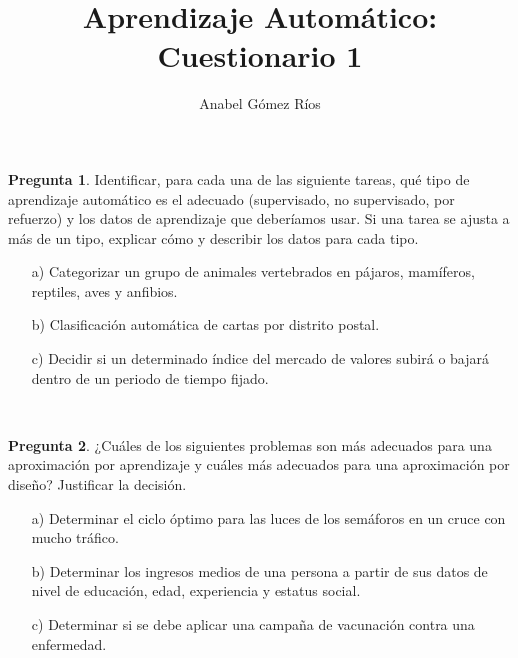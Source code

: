 \documentclass[12pt]{article}
\title{Aprendizaje Automático: Cuestionario 1}
\author{Anabel G\'omez R\'ios}
\theoremstyle{definition}
\begin{document}
\maketitle

\newtheorem{pregunta}{Pregunta}

\begin{pregunta}
Identificar, para cada una de las siguiente tareas, qué tipo de aprendizaje automático es el adecuado (supervisado, no supervisado, por refuerzo) y los datos de aprendizaje que deberíamos usar. Si una tarea se ajusta a más de un tipo, explicar cómo y describir los datos para cada tipo.
\begin{enumerate}
\item[a)] Categorizar un grupo de animales vertebrados en pájaros, mamíferos, reptiles, aves y anfibios.
\item[b)] Clasificación automática de cartas por distrito postal.
\item[c)] Decidir si un determinado índice del mercado de valores subirá o bajará dentro de un periodo de tiempo fijado.
\end{enumerate}
\textit{ }\\



\end{pregunta}

\begin{pregunta}
¿Cuáles de los siguientes problemas son más adecuados para una aproximación por aprendizaje y cuáles más adecuados para una aproximación por diseño? Justificar la decisión.
\begin{enumerate}
\item[a)] Determinar el ciclo óptimo para las luces de los semáforos en un cruce con mucho tráfico.
\item[b)] Determinar los ingresos medios de una persona a partir de sus datos de nivel de educación, edad, experiencia y estatus social.
\item[c)] Determinar si se debe aplicar una campaña de vacunación contra una enfermedad.
\end{enumerate}
\textit{ }\\

\end{pregunta}
\end{document}
